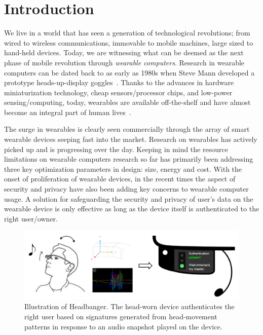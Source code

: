 \section{Introduction}\label{sec:intro}

We live in a world that has seen a generation of technological revolutions;
from wired to wireless communications, immovable to mobile machines, large
sized to hand-held devices. Today, we are witnessing what can be deemed as the
next phase of mobile revolution through {\em wearable computers}. Research in
wearable computers can be dated back to as early as 1980s when Steve Mann
developed a prototype heads-up-display goggles~\cite{mann1997wearable}. Thanks to the
advances in hardware miniaturization technology, cheap sensors/processor
chips, and low-power sensing/computing, today, wearables are available
off-the-shelf and have almost become an integral part of human
lives~\cite{googleglass,smartwatch,fitbit}.

The surge in wearables is clearly seen commercially through the array of
smart wearable devices seeping fast into the market. Research on wearables has
actively picked up and is progressing over the day. Keeping in mind the
resource limitations on wearable computers research so far has primarily
been addressing three key optimization parameters in
design: size, energy and cost. With the onset of proliferation of wearable
devices, in the recent times the aspect of security and privacy have also been
adding key concerns to wearable computer usage.
A solution for safeguarding the security and privacy of user's data on the
wearable device is only effective as long as the device itself is
authenticated to the right user/owner.

\begin{figure}
\centering
\includegraphics[width=\columnwidth]{fig/headbanger-illustrate.png}
\caption{Illustration of Headbanger. The head-worn device authenticates the
right user based on signatures generated from head-movement patterns in
response to an audio snapshot played on the device.}
\label{fig:headbanger-illustrate}
\end{figure}

